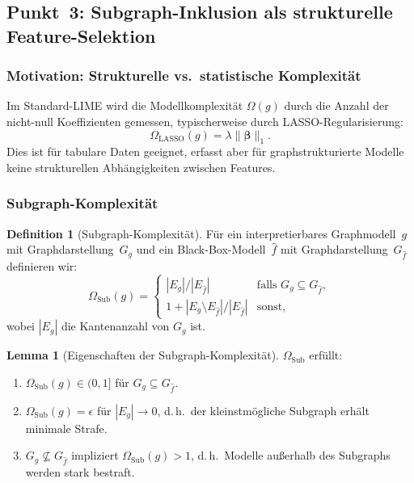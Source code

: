﻿\documentclass[a4paper,12pt]{article}
\theoremstyle{definition}
\newtheorem{definition}{Definition}[section]
\newtheorem{lemma}{Lemma}[section]
\begin{document}
\subsection{Punkt~3: Subgraph-Inklusion als strukturelle Feature-Selektion}

\subsubsection{Motivation: Strukturelle vs.\ statistische Komplexität}

Im Standard-LIME wird die Modellkomplexität $\Omega(g)$ durch die Anzahl der
nicht-null Koeffizienten gemessen, typischerweise durch LASSO-Regularisierung:
\[
  \Omega_{\mathrm{LASSO}}(g) = \lambda \|\boldsymbol{\beta}\|_1.
\]
Dies ist für tabulare Daten geeignet, erfasst aber für graphstrukturierte Modelle
keine strukturellen Abhängigkeiten zwischen Features.

\subsubsection{Subgraph-Komplexität}

\begin{definition}[Subgraph-Komplexität]
  Für ein interpretierbares Graphmodell~$g$ mit Graphdarstellung~$G_g$ und ein
  Black-Box-Modell~$\hat{f}$ mit Graphdarstellung~$G_{\hat{f}}$ definieren wir:
  \begin{equation}
    \Omega_{\mathrm{Sub}}(g) = \begin{cases}
      |E_g| / |E_{\hat{f}}| & \text{falls } G_g \subseteq G_{\hat{f}}, \\
      1 + |E_g \setminus E_{\hat{f}}| / |E_{\hat{f}}| & \text{sonst,}
    \end{cases}
    \label{eq:omega_sub}
  \end{equation}
  wobei $|E_g|$ die Kantenanzahl von $G_g$ ist.
\end{definition}

\begin{lemma}[Eigenschaften der Subgraph-Komplexität]
  $\Omega_{\mathrm{Sub}}$ erfüllt:
  \begin{enumerate}
    \item $\Omega_{\mathrm{Sub}}(g) \in (0, 1]$ für $G_g \subseteq G_{\hat{f}}$.
    \item $\Omega_{\mathrm{Sub}}(g) = \epsilon$ für $|E_g| \to 0$, d.\,h.\ der
          kleinstmögliche Subgraph erhält minimale Strafe.
    \item $G_g \not\subseteq G_{\hat{f}}$ impliziert $\Omega_{\mathrm{Sub}}(g) > 1$,
          d.\,h.\ Modelle außerhalb des Subgraphs werden stark bestraft.
  \end{enumerate}
\end{lemma}
\end{document}
